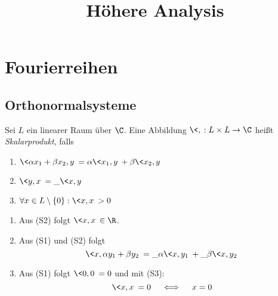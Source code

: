 \documentclass{mycourse}
\title{Höhere Analysis}
\begin{document}
\maketitle
\tableofcontents

\chapter{Fourierreihen}

\section{Orthonormalsysteme}

\begin{df} \label{1.1}
	Sei $L$ ein linearer Raum über $\C$.
	Eine Abbildung $\<,\>: L \times L \to \C$ heißt \emph{Skalarprodukt}, falls
	\begin{enumerate}[(S1)]
		\item
			$\<\alpha x_1 + \beta x_2, y \> = \alpha \<x_1,y\> + \beta \<x_2, y\>$
		\item
			$\<y,x\> = \_{\<x,y\>}$
		\item
			$\forall x\in L\setminus \{0\} : \<x,x\> > 0$
	\end{enumerate}
\end{df}

\begin{nt} \label{1.2}
	\begin{enumerate}[1)]
		\item
			Aus (S2) folgt $\<x,x\> \in \R$.
		\item
			Aus (S1) und (S2) folgt
			\[
				\<x, \alpha y_1 + \beta y_2\> = \_\alpha \<x,y_1\> + \_\beta \<x,y_2\>
			\]
		\item
			Aus (S1) folgt $\<0,0\> = 0$ und mit (S3):
			\[
				\<x,x\> = 0 \quad\iff\quad x=0
			\]
	\end{enumerate}
\end{nt}
\end{document}
